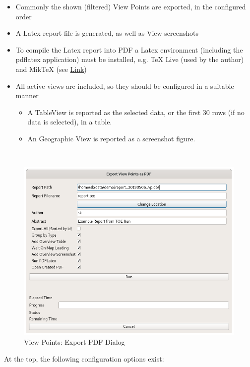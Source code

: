 \begin{itemize}  
\item Commonly the shown (filtered) View Points are exported, in the configured order
\item A Latex report file is generated, as well as View screenshots
\item To compile the Latex report into PDF a Latex environment (including the pdflatex application) must be installed, e.g. TeX Live (used by the author) and MikTeX (see \href{https://en.wikipedia.org/wiki/LaTeX}{Link})
\item All active views are included, so they should be configured in a suitable manner
\begin{itemize}  
\item A TableView is reported as the selected data, or the first 30 rows (if no data is selected), in a table.
\item An Geographic View is reported as a screenshot figure.
\end{itemize}
\end{itemize}
\ \\

\begin{figure}[H]
  \centering 
    \includegraphics[width=14cm]{figures/view_points_export_pdf.png}
  \caption{View Points: Export PDF Dialog}
\end{figure}

At the top, the following configuration options exist:

